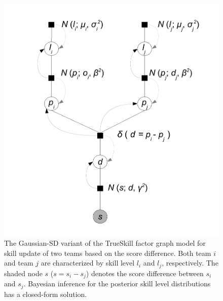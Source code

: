 \begin{figure}
\centerline{\includegraphics[scale=0.275]{modelAndInferenceGaussianGraphicalModelScoreDifference}}
\caption{\small
The Gaussian-SD variant of the TrueSkill factor graph model for skill update of two teams based on the score difference. Both team
$i$ and team $j$ are characterized by skill level $l_i$ and $l_j$,
respectively. The shaded node $s$ ($s=s_i-s_j$) denotes the score
difference between $s_i$ and $s_j$. Bayesian inference for the posterior
skill level distributions has a closed-form solution.}
\label{fig:modelAndInferenceGaussianGraphicalModelScoreDifference}
\end{figure}
